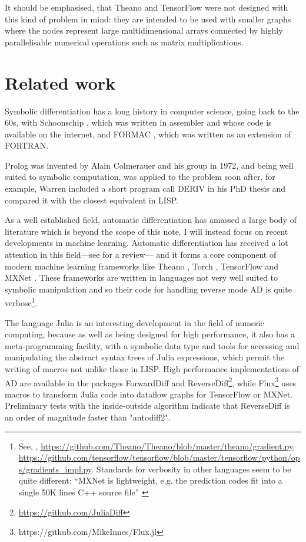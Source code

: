 It should be emphasised, that Theano and TensorFlow were not
designed with this kind of problem in mind: they are intended to be used
with smaller graphs where the nodes represent large multidimensional 
arrays connected by highly parallelisable numerical operations such as
matrix multiplications.


\section{Related work}

Symbolic differentiation has a long history in computer science,
going back to the 60s, with Schoonschip \citep{Veltman1967}, which was
written in assembler and whose code is available on the internet, and
FORMAC \citep{SammetBond1964}, which was written as an extension of FORTRAN.

Prolog was invented by Alain Colmerauer and his group in 1972, and being 
well suited to symbolic computation, 
was applied to the problem soon after, for example, Warren included a short 
program call DERIV in his PhD thesis \citep{Warren1978} and compared it with the 
closest equivalent in LISP.

As a well established field, automatic differentiation has amassed a large body
of literature which is beyond the scope of this note. I will instead focus on
recent developments in machine learning.
Automatic differentiation has received a lot attention in this field---see
\cite{BaydinPearlmutterRadul2015} for a review---
and it forms a core component of modern machine learning frameworks like 
Theano \citep{ChenLiLi2015}, Torch \citep{CollobertKavukcuogluFarabet2011}, 
TensorFlow \citep{MartinAbadiAshishAgarwalPaulBarham2015} and MXNet \citep{ChenLiLi2015}. 
These frameworks are written in languages not very well suited to symbolic manipulation 
and so their code for handling reverse mode AD is quite verbose\footnote{
See, \eg, \url{https://github.com/Theano/Theano/blob/master/theano/gradient.py},
\url{https://github.com/tensorflow/tensorflow/blob/master/tensorflow/python/ops/gradients_impl.py}.
Standards for verbosity in other languages seem to be quite different:
``MXNet is lightweight, e.g. the prediction codes fit into a single 50K lines C++ source file''
\citep{ChenLiLi2015}}.

The language Julia \citep{BezansonEdelmanKarpinski2017} is an interesting 
development in the field of numeric computing, because as well as being designed 
for high performance, it also has a meta-programming facility, with a symbolic data type and
tools for accessing and manipulating the abstract syntax trees of Julia expressions,
which permit the writing of macros not unlike those in LISP.
High performance implementations of AD are available in the packages ForwardDiff
and ReverseDiff\footnote{\url{https://github.com/JuliaDiff}}, while 
Flux\footnote{https://github.com/MikeInnes/Flux.jl} uses macros to transform Julia
code into dataflow graphs for TensorFlow or MXNet. Preliminary tests with the
inside-outside algorithm indicate that ReverseDiff is an order of magnitude faster
than "autodiff2".

